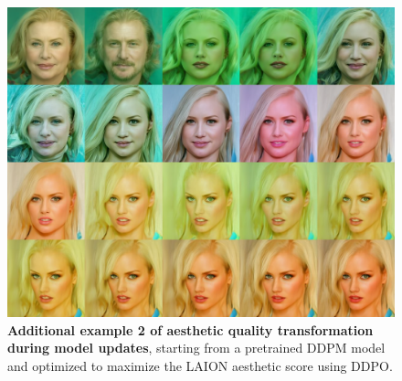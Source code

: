 \begin{appendixs}
        \begin{figure}
            \centering
            \includegraphics[scale=1.40]{img/results/laion_12.png}
            \vspace{-0pt}  %
            \captionsetup{width=\textwidth} %
            \caption{\textbf{Additional example 2 of aesthetic quality transformation during model updates}, starting from a pretrained DDPM model and optimized to maximize the LAION aesthetic score using DDPO.}
            \label{fig:ddpm-to-ddpo-aesthetic-extra2}
        \end{figure}


\end{appendixs}
